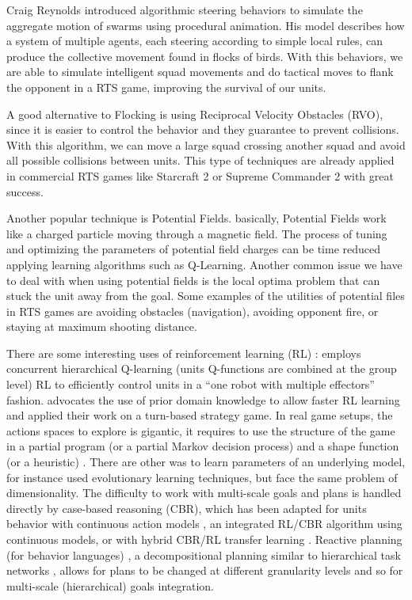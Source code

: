 \documentclass[journal]{IEEEtran}
\begin{document}
Craig Reynolds introduced algorithmic steering behaviors to simulate the aggregate motion of swarms using procedural animation\cite{Reynolds_1999}. His model describes how a system of multiple agents, each steering according to simple local rules, can produce the collective movement found in flocks of birds. With this behaviors, we are able to simulate intelligent squad movements and do tactical moves to flank the opponent in a RTS game\cite{Danielsiek_2008,SynnaeveMicroCig11}, improving the survival of our units.

A good alternative to Flocking is using Reciprocal Velocity Obstacles (RVO)\cite{Berg_2008}, since it is easier to control the behavior and they guarantee to prevent collisions. With this algorithm, we can move a large squad crossing another squad and avoid all possible collisions between units. This type of techniques are already applied in commercial RTS games like Starcraft 2 or Supreme Commander 2 with great success.

Another popular technique is Potential Fields. basically, Potential Fields work like a charged particle moving through a magnetic field. The process of tuning and optimizing the parameters of potential field charges can be time reduced applying learning algorithms such as Q-Learning\cite{Liu_2008}. Another common issue we have to deal with when using potential fields is the local optima problem that can stuck the unit away from the goal. Some examples of the utilities of potential files in RTS games are avoiding obstacles (navigation), avoiding opponent fire, or staying at maximum shooting distance\cite{Hagelback08,Hagelback09}.

There are some interesting uses of reinforcement learning (RL) \cite{Sutton}: \cite{Marthi05} employs concurrent hierarchical Q-learning (units Q-functions are combined at the group level) RL to efficiently control units in a ``one robot with multiple effectors'' fashion. \cite{Madeira06} advocates the use of prior domain knowledge to allow faster RL learning and applied their work on a turn-based strategy game. In real game setups, the actions spaces to explore is gigantic, it requires to use the structure of the game in a partial program (or a partial Markov decision process) and a shape function (or a heuristic) \cite{Marthi05}. There are other was to learn parameters of an underlying model, for instance \cite{GA} used evolutionary learning techniques, but face the same problem of dimensionality. The difficulty to work with multi-scale goals and plans is handled directly by case-based reasoning (CBR), which has been adapted for units behavior with continuous action models \cite{Molineaux08}, an integrated RL/CBR algorithm using continuous models, or with hybrid CBR/RL transfer learning \cite{CBR-RL}. Reactive planning (for behavior languages) \cite{WeberCig10}, a decompositional planning similar to hierarchical task networks \cite{HTNPlanning}, allows for plans to be changed at different granularity levels and so for multi-scale (hierarchical) goals integration.
\end{document}
